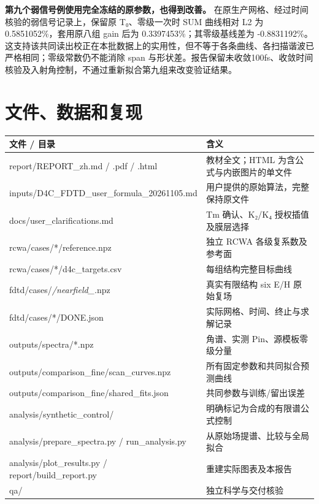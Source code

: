 \documentclass[
  chinese,
  UTF8,
  a4paper,
  11pt]{ctexart}
\newcounter{none} %
\begin{document}
\textbf{第九个弱信号例使用完全冻结的原参数，也得到改善。}
在原生产网格、经过时间核验的弱信号记录上，保留原 T₀、零级一次时 SUM
曲线相对 L2 为 0.5851052\%，套用原八组 gain 后为
0.3397453\%；其零级基线差为
-0.8831192\%。这支持该共同读出校正在本批数据上的实用性，但不等于各条曲线、各扫描谐波已严格相同；零级常数仍不能消除
span
与形状差。报告保留未收敛100fs、收敛时间核验及入射角控制，不通过重新拟合第九组来改变验证结果。

\section{文件、数据和复现}\label{ux6587ux4ef6ux6570ux636eux548cux590dux73b0}

{\def\LTcaptype{none} %
\begin{longtable}[]{@{}
  >{\raggedright\arraybackslash}p{}
  >{\raggedright\arraybackslash}p{}@{}}
\toprule\noalign{}
\begin{minipage}[b]{\linewidth}\raggedright
文件 / 目录
\end{minipage} & \begin{minipage}[b]{\linewidth}\raggedright
含义
\end{minipage} \\
\midrule\noalign{}
\endhead
\bottomrule\noalign{}
\endlastfoot
report/REPORT\_zh.md / .pdf / .html & 教材全文；HTML
为含公式与内嵌图片的单文件 \\
inputs/D4C\_FDTD\_user\_formula\_20261105.md &
用户提供的原始算法，完整保持原文件 \\
docs/user\_clarifications.md & Tm 确认、K₂/K₄ 授权插值及膜层选择 \\
rcwa/cases/*/reference.npz & 独立 RCWA 各级复系数及参考面 \\
rcwa/cases/*/d4c\_targets.csv & 每组结构完整目标曲线 \\
fdtd/cases/\emph{/nearfield\_}.npz & 真实有限结构 six E/H 原始复场 \\
fdtd/cases/*/DONE.json & 实际网格、时间、终止与求解记录 \\
outputs/spectra/*.npz & 角谱、实测 Pin、源模板零级分量 \\
outputs/comparison\_fine/scan\_curves.npz &
所有固定参数和共同拟合预测曲线 \\
outputs/comparison\_fine/shared\_fits.json & 共同参数与训练/留出误差 \\
analysis/synthetic\_control/ & 明确标记为合成的有限谱公式控制 \\
analysis/prepare\_spectra.py / run\_analysis.py &
从原始场提谱、比较与全局拟合 \\
analysis/plot\_results.py / report/build\_report.py &
重建实际图表及本报告 \\
qa/ & 独立科学与交付核验 \\
\end{longtable}
}
\end{document}
